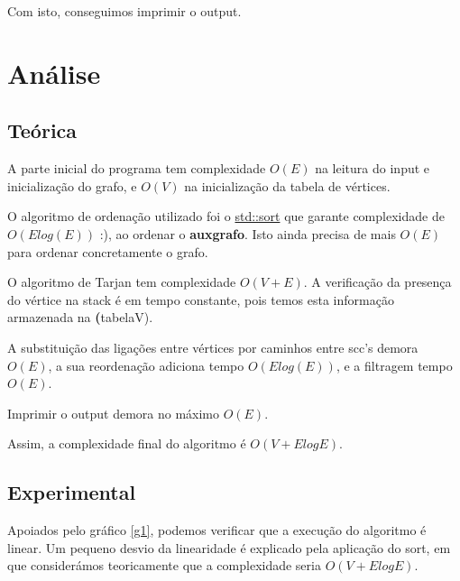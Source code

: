 \documentclass[12pt,a4paper]{article}
\begin{document}
Com isto, conseguimos imprimir o output.
\section{Análise}
\subsection{Teórica}
A parte inicial do programa tem complexidade $O(E)$ na leitura do input e inicialização do grafo, e $O(V)$ na inicialização da tabela de vértices.

O algoritmo de ordenação utilizado foi o \href{http://www.cplusplus.com/reference/algorithm/sort/}{std::sort} que garante complexidade de $O(Elog(E))$ :), ao ordenar o \textbf{auxgrafo}.
Isto ainda precisa de mais $O(E)$ para ordenar concretamente o grafo.

O algoritmo de Tarjan tem complexidade $O(V+E)$. A verificação da presença do vértice na stack é em tempo constante, pois temos esta informação armazenada na \textbf(tabelaV).

A substituição das ligações entre vértices por caminhos entre scc's demora $O(E)$, a sua reordenação adiciona tempo $O(Elog(E))$, e a filtragem tempo $O(E)$.

Imprimir o output demora no máximo $O(E)$.

Assim, a complexidade final do algoritmo é \textbf{$O(V+ElogE)$}.

\subsection{Experimental}
Apoiados pelo gráfico \ref{g1}, podemos verificar que a execução do algoritmo é linear.
Um pequeno desvio da linearidade é explicado pela aplicação do sort, em que considerámos teoricamente que a complexidade seria \textbf{$O(V+ElogE)$}.
\end{document}
